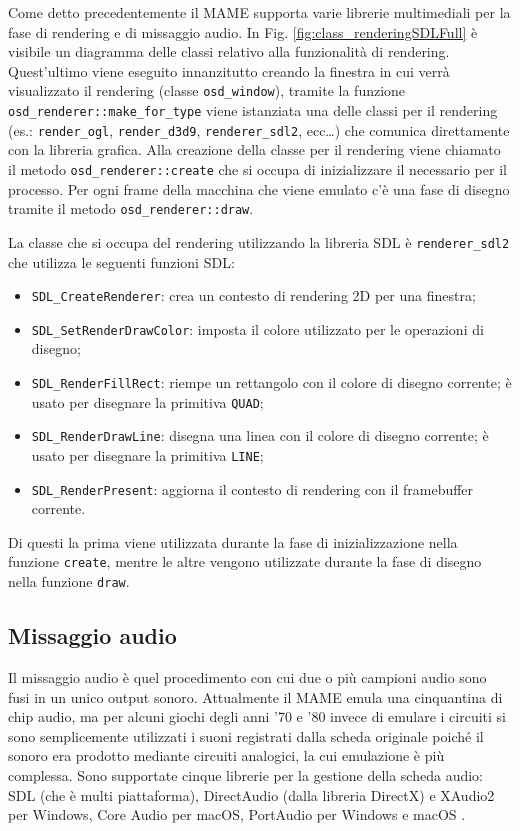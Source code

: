 Come detto precedentemente il MAME supporta varie librerie multimediali per la fase di rendering e di missaggio audio. In Fig. \ref{fig:class_renderingSDLFull} è visibile un diagramma delle classi relativo alla funzionalità di rendering. Quest'ultimo viene eseguito innanzitutto creando la finestra in cui verrà visualizzato il rendering (classe \verb|osd_window|), tramite la funzione \verb|osd_renderer::make_for_type| viene istanziata una delle classi per il rendering (es.: \verb|render_ogl|, \verb|render_d3d9|, \verb|renderer_sdl2|, ecc\dots) che comunica direttamente con la libreria grafica. Alla creazione della classe per il rendering viene chiamato il metodo \verb|osd_renderer::create| che si occupa di inizializzare il necessario per il processo. Per ogni frame della macchina che viene emulato c'è una fase di disegno tramite il metodo \verb|osd_renderer::draw|.

La classe che si occupa del rendering utilizzando la libreria SDL è \verb|renderer_sdl2| che utilizza le seguenti funzioni SDL:

\begin{itemize}	
	\item \verb|SDL_CreateRenderer|: crea un contesto di rendering 2D per una finestra;
	\item \verb|SDL_SetRenderDrawColor|: imposta il colore utilizzato per le operazioni di disegno;
	\item \verb|SDL_RenderFillRect|: riempe un rettangolo con il colore di disegno corrente; è usato per disegnare la primitiva \verb|QUAD|;
	\item \verb|SDL_RenderDrawLine|: disegna una linea con il colore di disegno corrente; è usato per disegnare la primitiva \verb|LINE|;
	\item \verb|SDL_RenderPresent|: aggiorna il contesto di rendering con il framebuffer corrente.
\end{itemize}

Di questi la prima viene utilizzata durante la fase di inizializzazione nella funzione \verb|create|, mentre le altre vengono utilizzate durante la fase di disegno nella funzione \verb|draw|.



\subsection{Missaggio audio}
Il missaggio audio è quel procedimento con cui due o più campioni audio sono fusi in un unico output sonoro. Attualmente il MAME emula una cinquantina di chip audio, ma per alcuni giochi degli anni '70 e '80 invece di emulare i circuiti si sono semplicemente utilizzati i suoni registrati dalla scheda originale poiché il sonoro era prodotto mediante circuiti analogici, la cui emulazione è più complessa. Sono supportate cinque librerie per la gestione della scheda audio: SDL (che è multi piattaforma), DirectAudio (dalla libreria DirectX) e XAudio2 per Windows, Core Audio per macOS, PortAudio per Windows e macOS \parencite{Il_progetto_MAME}.

